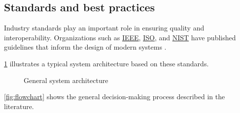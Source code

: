 \subsection{Standards and best practices}

Industry standards play an important role in ensuring quality and interoperability.
Organizations such as \hyperlink{ieee}{IEEE}, \hyperlink{iso}{ISO}, and \hyperlink{nist}{NIST} have published guidelines that inform the design of modern systems \cite{nist-guide}.

\cref{fig:architecture} illustrates a typical system architecture based on these standards.

\begin{figure}[H]
    \centering
    \caption{General system architecture} \label{fig:architecture}
\end{figure}

\cref{fig:flowchart} shows the general decision-making process described in the literature.

